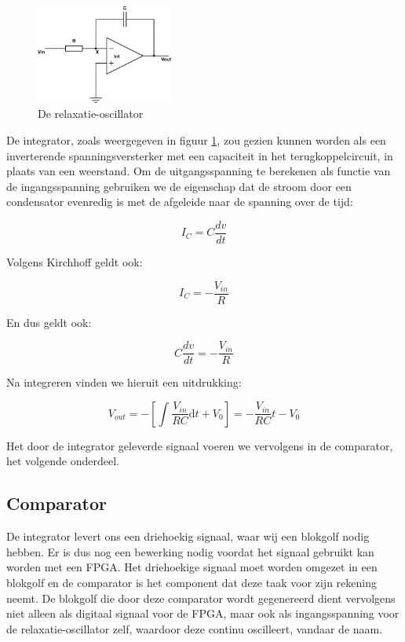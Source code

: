 \documentclass{report}
\begin{document}
\begin{figure}
	\centering
	\includegraphics[width=0.4\textwidth]{integrator.png}
	\caption{De relaxatie-oscillator}
	\label{fig:int}
\end{figure}

De integrator, zoals weergegeven in figuur \ref{fig:int}, zou gezien kunnen worden als een inverterende spanningsversterker met een capaciteit in het terugkoppelcircuit, in plaats van een weerstand. Om de uitgangsspanning te berekenen als functie van de ingangsspanning gebruiken we de eigenschap dat de stroom door een condensator evenredig is met de afgeleide naar de spanning over de tijd:

$$I_{C} = C\frac{dv}{dt}$$

\noindent
Volgens Kirchhoff geldt ook:

$$I_{C} = -\frac{V_{in}}{R}$$

\noindent
En dus geldt ook:

$$C\frac{dv}{dt} = -\frac{V_{in}}{R}$$

\noindent
Na integreren vinden we hieruit een uitdrukking:

\begin{equation}
	V_{out} = -\left\lbrack\int \frac{V_{in}}{RC} \mathrm{d}t + V_{0}\right\rbrack = -\frac{V_{in}}{RC} t - V_{0}
	\label{eq:int}
\end{equation}

\noindent
Het door de integrator geleverde signaal voeren we vervolgens in de comparator, het volgende onderdeel.

\subsection{Comparator}

De integrator levert ons een driehoekig signaal, waar wij een blokgolf nodig hebben. Er is dus nog een bewerking nodig voordat het signaal gebruikt kan worden met een FPGA. Het driehoekige signaal moet worden omgezet in een blokgolf en de comparator is het component dat deze taak voor zijn rekening neemt. De blokgolf die door deze comparator wordt gegenereerd dient vervolgens niet alleen als digitaal signaal voor de FPGA, maar ook als ingangsspanning voor de relaxatie-oscillator zelf, waardoor deze continu oscilleert, vandaar de naam.
\end{document}

